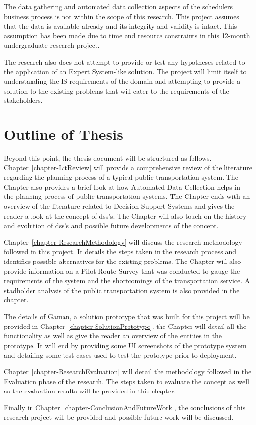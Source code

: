 The data gathering and automated data collection aspects of the schedulers business process is not within the scope of this research. This project assumes that the data is available already and its integrity and validity is intact. This assumption has been made due to time and resource constraints in this 12-month undergraduate research project.

The research also does not attempt to provide or test any hypotheses related to the application of an Expert System-like solution. The project will limit itself to understanding the IS requirements of the domain and attempting to provide a solution to the existing problems that will cater to the requirements of the stakeholders.



\section{Outline of Thesis}
\label{section-OutlineOfThesis}

Beyond this point, the thesis document will be structured as follows. Chapter~\ref{chapter-LitReview} will provide a comprehensive review of the literature regarding the planning process of a typical public transportation system. The Chapter also provides a brief look at how Automated Data Collection helps in the planning process of public transportation systems. The Chapter ends with an overview of the literature related to Decision Support Systems and gives the reader a look at the concept of \acrshort{dss}'s. The Chapter will also touch on the history and evolution of \acrshort{dss}'s and possible future developments of the concept.

Chapter~\ref{chapter-ResearchMethodology} will discuss the research methodology followed in this project. It details the steps taken in the research process and identifies possible alternatives for the existing problems. The Chapter will also provide information on a Pilot Route Survey that was conducted to gauge the requirements of the system and the shortcomings of the transportation service. A stadholder analysis of the public transportation system is also provided in the chapter.

The details of Gaman, a solution prototype that was built for this project will be provided in Chapter~\ref{chapter-SolutionPrototype}. the Chapter will detail all the functionality as well as give the reader an overview of the entities in the prototype. It will end by providing some UI screenshots of the prototype system and detailing some test cases used to test the prototype prior to deployment.

Chapter~\ref{chapter-ResearchEvaluation} will detail the methodology followed in the Evaluation phase of the research. The steps taken to evaluate the concept as well as the evaluation results will be provided in this chapter.

Finally in Chapter~\ref{chapter-ConclusionAndFutureWork}, the conclusions of this research project will be provided and possible future work will be discussed.


